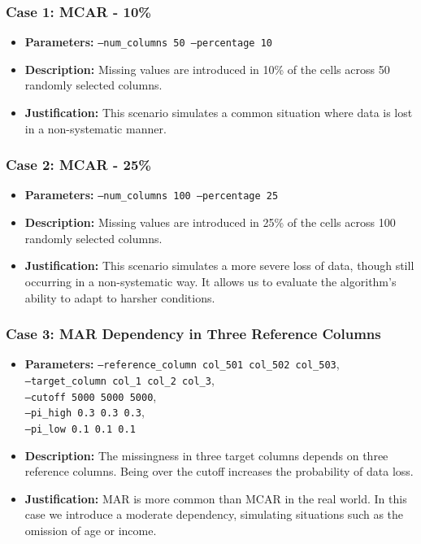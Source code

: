 \documentclass[a4paper,12pt]{article}
\begin{document}
\subsubsection{Case 1: MCAR - 10\%}
\begin{itemize}
    \item \textbf{Parameters:} \texttt{--num\_columns 50 --percentage 10}
    \item \textbf{Description:} Missing values are introduced in 10\% of the cells across 50 randomly selected columns.
    \item \textbf{Justification:} This scenario simulates a common situation where data is lost in a non-systematic manner.
\end{itemize}

\subsubsection{Case 2: MCAR - 25\%}
\begin{itemize}
    \item \textbf{Parameters:} \texttt{--num\_columns 100 --percentage 25}
    \item \textbf{Description:} Missing values are introduced in 25\% of the cells across 100 randomly selected columns.
    \item \textbf{Justification:} This scenario simulates a more severe loss of data, though still occurring in a non-systematic way. It allows us to evaluate the algorithm's ability to adapt to harsher conditions.
\end{itemize}

\subsubsection{Case 3: MAR Dependency in Three Reference Columns}
\begin{itemize}
    \item \textbf{Parameters:} \texttt{--reference\_column col\_501 col\_502 col\_503},\\
    \texttt{--target\_column col\_1 col\_2 col\_3},\\
    \texttt{--cutoff 5000 5000 5000},\\
    \texttt{--pi\_high 0.3 0.3 0.3},\\
    \texttt{--pi\_low 0.1 0.1 0.1}
    
    \item \textbf{Description:} The missingness in three target columns depends on three reference columns. Being over the cutoff increases the probability of data loss.
    \item \textbf{Justification:} MAR is more common than MCAR in the real world. In this case we introduce a moderate dependency, simulating situations such as the omission of age or income.  
\end{itemize}
\end{document}
